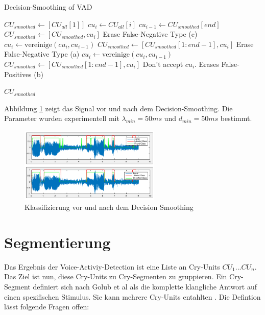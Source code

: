 \begin{algorithm}[H]
	\caption{Decision-Smoothing of VAD}
	\label{alg:decisionSmoothing}
	\begin{algorithmic}[1]
		\State $CU_{smoothed} \gets[CU_{all}[1]] $
		\State $cu_i \gets CU_{all}[i]$
		\State $cu_{i-1} \gets CU_{smoothed}[end]$
		\State $CU_{smoothed} \gets [CU_{smoothed}, cu_i] $
		\Else
		\State \Comment Erase False-Negative Type (c)
		\State $cu_i \gets \text{vereinige}(cu_i, cu_{i-1})$
		\State $CU_{smoothed} \gets [CU_{smoothed}[1:end-1], cu_i] $
		\EndIf
		\Else
		\State \Comment Erase False-Negative Type (a)
		\State $cu_i \gets \text{vereinige}(cu_i, cu_{i-1})$
		\State $CU_{smoothed} \gets [CU_{smoothed}[1:end-1], cu_i] $
		\Else
		\State \Comment Don't accept $cu_i$. Erases False-Positives (b)
		\EndIf
		\EndIf
		\EndFor
		
		\Return $CU_{smoothed}$
		\EndFunction
		
	\end{algorithmic}
\end{algorithm}

Abbildung \ref{img:after-smoothing} zeigt das Signal vor und nach dem Decision-Smoothing. Die Parameter wurden experimentell mit $\lambda_{min} = 50 ms$ und $d_{min} = 50 ms$ bestimmt.

\begin{figure}[h]
	\centering
	\includegraphics[width=0.6\textwidth]{bilder/smoothing04.png}
	\caption{Klassifizierung vor und nach dem Decision Smoothing}
	\label{img:after-smoothing}
\end{figure}

\section{Segmentierung}
\label{sec:segmenting}
Das Ergebnis der Voice-Activiy-Detection ist eine Liste an Cry-Units  $CU_1 ... CU_n$. Das Ziel ist nun, diese Cry-Units zu Cry-Segmenten zu gruppieren. Ein Cry-Segment definiert sich nach Golub et al \cite{cryModel} als \glqq die komplette klangliche Antwort auf einen spezifischen Stimulus. Sie kann mehrere Cry-Units entahlten \grqq . Die Defintion lässt folgende Fragen offen:

